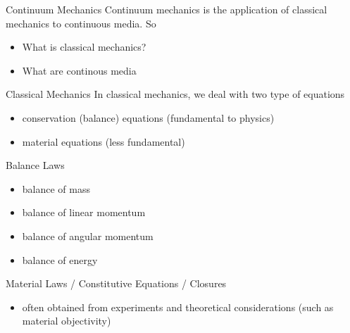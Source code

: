 \documentclass[hide notes,intlimits]{beamer}
\begin{document}


\begin{frame}{Continuum Mechanics}
Continuum mechanics is the application of \alert{classical mechanics} to \alert{continuous media}. So
\vspace{1em}
\begin{itemize}
\item What is classical mechanics?
\item What are continous media
\end{itemize}
\end{frame}


\begin{frame}{Classical Mechanics}
In classical mechanics, we deal with two type of equations
\vspace{1em}
\begin{itemize}
\item conservation (balance) equations (fundamental to physics)
\item material equations (less fundamental)
\end{itemize}
 \begin{block}{Balance Laws}
    \begin{itemize}
    \item balance of mass
    \item balance of linear momentum
    \item balance of angular momentum
    \item balance of energy
    \end{itemize}
  \end{block}
  \begin{block}{Material Laws / Constitutive Equations / Closures}
    \begin{itemize}
      \item often obtained from experiments and theoretical considerations (such as material objectivity)
   \end{itemize}
  \end{block}
\end{frame}
\end{document}
